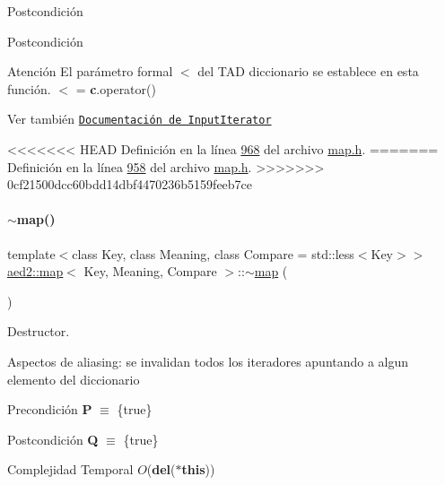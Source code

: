 \begin{DoxyPostcond}{\-Postcondición}
\begin{DoxyPostcond}{\-Postcondición}
\begin{DoxyAttention}{Atención}
El parámetro formal $<$ del T\+AD diccionario se establece en esta función. $<$ = {\bfseries c}.operator()
\end{DoxyAttention}
\begin{DoxySeeAlso}{Ver también}
\href{http://en.cppreference.com/w/cpp/concept/InputIterator}{\tt Documentación de Input\+Iterator} 
\end{DoxySeeAlso}


<<<<<<< HEAD
\-Definición en la línea \hyperlink{map_8h_source_l00968}{968} del archivo \hyperlink{map_8h_source}{map.\-h}.
=======
Definición en la línea \hyperlink{map_8h_source_l00958}{958} del archivo \hyperlink{map_8h_source}{map.\+h}.
>>>>>>> 0cf21500dcc60bdd14dbf4470236b5159feeb7ce

\mbox{\label{classaed2_1_1map_ab22c9a85c2dadbc286cd30e97069a8e6_ab22c9a85c2dadbc286cd30e97069a8e6}} 
\paragraph{\texorpdfstring{$\sim$map()}{~map()}}
{\footnotesize\ttfamily template$<$class Key, class Meaning, class Compare = std\+::less$<$\+Key$>$$>$ \\
\hyperlink{classaed2_1_1map}{aed2\+::map}$<$ Key, Meaning, Compare $>$\+::$\sim$\hyperlink{classaed2_1_1map}{map} (\begin{DoxyParamCaption}{ }\end{DoxyParamCaption})\hspace{0.3cm}{\ttfamily [inline]}}



Destructor. 

\begin{DoxyParagraph}{Aspectos de aliasing\+:}
se invalidan todos los iteradores apuntando a algun elemento del diccionario
\end{DoxyParagraph}
\begin{DoxyPrecond}{Precondición}
{\bfseries P} $\equiv$ \{true\} 
\end{DoxyPrecond}
\begin{DoxyPostcond}{Postcondición}
{\bfseries Q} $\equiv$ \{true\}
\end{DoxyPostcond}

\begin{DoxyDescription}
\item[Complejidad Temporal]$O$({\bfseries del}({\bfseries $\ast$this}))
\end{DoxyDescription}


\end{DoxyPostcond}
\end{DoxyPostcond}
